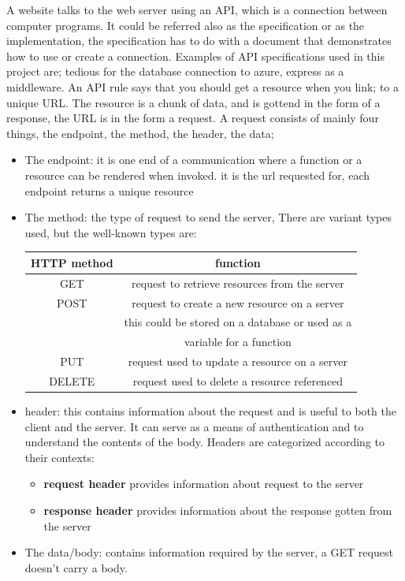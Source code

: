 A website talks to the web server using an API, which is a connection between computer programs. It could be referred also as the specification or as the implementation, the specification has to do with a document that demonstrates how to use or create a connection. Examples of API specifications used in this project are; tedious for the database connection to azure, express as a middleware. An API rule says that you should get a resource when you link; to a unique URL. The resource is a chunk of data, and is gottend in the form of a response, the URL is in the form a request. A request consists of mainly four things, the endpoint, the method, the header, the data;
\begin{itemize}
  \item The endpoint: it is one end of a communication where a function or a resource can be rendered when invoked. it is the url requested for, each endpoint returns a unique resource
  \item The method: the type of request to send the server, There are variant types used, but the well-known types are:
  \begin{center}
    \begin{tabular}{|c|   c   |}
      \hline
      \textbf{HTTP method} & function\\
      \hline
      GET & request to retrieve resources from the server\\
      \hline
      POST & request to create a new resource on a server\\
      & this could be stored on a database or used as a\\
      & variable for a function\\
      \hline
      PUT & request used to update a resource on a server\\
      \hline
      DELETE & request used to delete a resource referenced\\
      \hline
    \end{tabular}
  \end{center}
  \item header: this contains information about the request and is useful to both the client and the server. It can serve as a means of authentication and to understand the contents of the body. Headers are categorized according to their contexts:
  \begin{itemize}
    \item \textbf{request header} provides information about request to the server
    \item \textbf{response header} provides information about the response gotten from the server
  \end{itemize}
  \item The data/body: contains information required by the server, a GET request doesn't carry a body.
\end{itemize}


